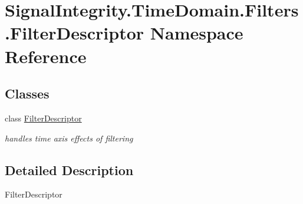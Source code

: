 \hypertarget{namespaceSignalIntegrity_1_1TimeDomain_1_1Filters_1_1FilterDescriptor}{}\section{Signal\+Integrity.\+Time\+Domain.\+Filters.\+Filter\+Descriptor Namespace Reference}
\label{namespaceSignalIntegrity_1_1TimeDomain_1_1Filters_1_1FilterDescriptor}
\subsection*{Classes}
\begin{DoxyCompactItemize}
\item 
class \hyperlink{classSignalIntegrity_1_1TimeDomain_1_1Filters_1_1FilterDescriptor_1_1FilterDescriptor}{Filter\+Descriptor}
\begin{DoxyCompactList}\small\item\em handles time axis effects of filtering \end{DoxyCompactList}\end{DoxyCompactItemize}


\subsection{Detailed Description}
\begin{DoxyVerb}FilterDescriptor\end{DoxyVerb}
 